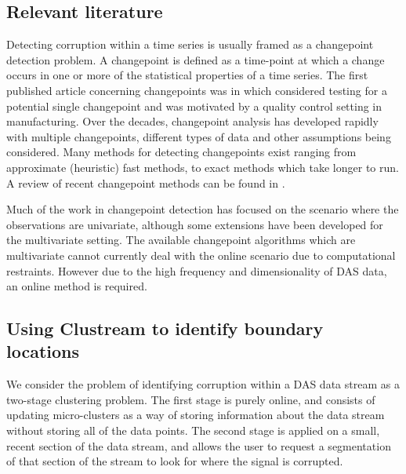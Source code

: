 \subsection{Relevant literature}

Detecting corruption within a time series is usually framed as a changepoint detection problem. A changepoint is defined as a time-point at which a change occurs in one or more of the statistical properties of a time series. The first published article concerning changepoints was in \cite{Page1954} which considered testing for a potential single changepoint and was motivated by a quality control setting in manufacturing. Over the decades, changepoint analysis has developed rapidly with multiple changepoints, different types of data and other assumptions being considered. Many methods for detecting changepoints exist ranging from approximate (heuristic) fast methods, to exact methods which take longer to run. A review of recent changepoint methods can be found in \cite{Chen2012,Eckley2011b}.

Much of the work in changepoint detection has focused on the scenario where the observations are univariate, although some extensions have been developed for the multivariate setting. The available changepoint algorithms which are multivariate cannot currently deal with the online scenario due to computational restraints. However due to the high frequency and dimensionality of DAS data, an online method is required. 


\subsection{Using  Clustream to identify boundary locations}

We consider the problem of identifying corruption within a DAS data stream as a two-stage clustering problem. The first stage is purely online, and consists of updating micro-clusters as a way of storing information about the data stream without storing all of the data points.  The second stage is applied on a small, recent section of the data stream, and allows the user to request a segmentation of that section of the stream to look for where the signal is corrupted. 
